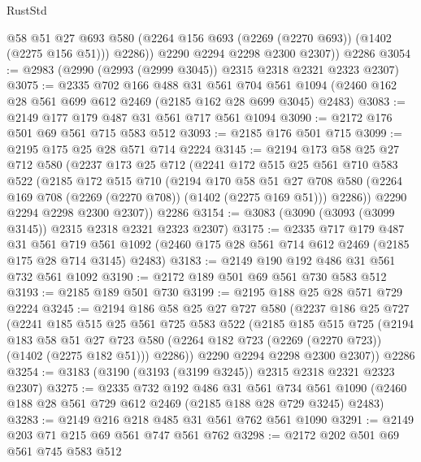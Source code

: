 \begin{lexlean}{RustStd}
\begin{coremodule}
            @58
            @51
            @27
            @693
            @580
            (@2264 @156 @693 (@2269 (@2270 @693)) (@1402 (@2275 @156 @51)))
            @2286))
        @2290
        @2294
        @2298
        @2300
        @2307))
    @2286
@3054 := @2983 (@2990 (@2993 (@2999 @3045)) @2315 @2318 @2321 @2323 @2307)
@3075 := @2335
    @702
    @166
    @488
    @31
    @561
    @704
    @561
    @1094
    (@2460 @162 @28 @561 @699 @612 @2469 (@2185 @162 @28 @699 @3045) @2483)
@3083 := @2149 @177 @179 @487 @31 @561 @717 @561 @1094
@3090 := @2172 @176 @501 @69 @561 @715 @583 @512
@3093 := @2185 @176 @501 @715
@3099 := @2195 @175 @25 @28 @571 @714 @2224
@3145 := @2194
    @173
    @58
    @25
    @27
    @712
    @580
    (@2237
      @173
      @25
      @712
      (@2241
        @172
        @515
        @25
        @561
        @710
        @583
        @522
        (@2185
          @172
          @515
          @710
          (@2194
            @170
            @58
            @51
            @27
            @708
            @580
            (@2264 @169 @708 (@2269 (@2270 @708)) (@1402 (@2275 @169 @51)))
            @2286))
        @2290
        @2294
        @2298
        @2300
        @2307))
    @2286
@3154 := @3083 (@3090 (@3093 (@3099 @3145)) @2315 @2318 @2321 @2323 @2307)
@3175 := @2335
    @717
    @179
    @487
    @31
    @561
    @719
    @561
    @1092
    (@2460 @175 @28 @561 @714 @612 @2469 (@2185 @175 @28 @714 @3145) @2483)
@3183 := @2149 @190 @192 @486 @31 @561 @732 @561 @1092
@3190 := @2172 @189 @501 @69 @561 @730 @583 @512
@3193 := @2185 @189 @501 @730
@3199 := @2195 @188 @25 @28 @571 @729 @2224
@3245 := @2194
    @186
    @58
    @25
    @27
    @727
    @580
    (@2237
      @186
      @25
      @727
      (@2241
        @185
        @515
        @25
        @561
        @725
        @583
        @522
        (@2185
          @185
          @515
          @725
          (@2194
            @183
            @58
            @51
            @27
            @723
            @580
            (@2264 @182 @723 (@2269 (@2270 @723)) (@1402 (@2275 @182 @51)))
            @2286))
        @2290
        @2294
        @2298
        @2300
        @2307))
    @2286
@3254 := @3183 (@3190 (@3193 (@3199 @3245)) @2315 @2318 @2321 @2323 @2307)
@3275 := @2335
    @732
    @192
    @486
    @31
    @561
    @734
    @561
    @1090
    (@2460 @188 @28 @561 @729 @612 @2469 (@2185 @188 @28 @729 @3245) @2483)
@3283 := @2149 @216 @218 @485 @31 @561 @762 @561 @1090
@3291 := @2149 @203 @71 @215 @69 @561 @747 @561 @762
@3298 := @2172 @202 @501 @69 @561 @745 @583 @512

\end{coremodule}
\end{lexlean}
